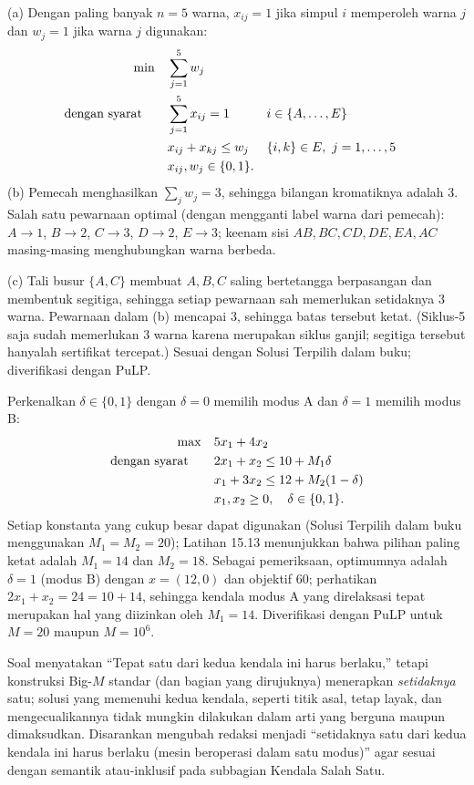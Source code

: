 
(a) Dengan paling banyak $n = 5$ warna, $x_{ij} = 1$ jika simpul $i$ memperoleh warna $j$ dan $w_j = 1$ jika warna $j$ digunakan:
\[
\begin{aligned}
\min\quad & \sum_{j=1}^{5} w_j\\
\mbox{dengan syarat}\quad\quad & \sum_{j=1}^{5} x_{ij} = 1 && i \in \{A,\dots,E\}\\
& x_{ij} + x_{kj} \leq w_j && \{i,k\} \in E,\ j = 1,\dots,5\\
& x_{ij}, w_j \in \{0,1\}.
\end{aligned}
\]
(b) Pemecah menghasilkan $\sum_j w_j = 3$, sehingga bilangan kromatiknya adalah 3. Salah satu pewarnaan optimal (dengan mengganti label warna dari pemecah): $A \to 1$, $B \to 2$, $C \to 3$, $D \to 2$, $E \to 3$; keenam sisi $AB, BC, CD, DE, EA, AC$ masing-masing menghubungkan warna berbeda.

(c) Tali busur $\{A,C\}$ membuat $A, B, C$ saling bertetangga berpasangan dan membentuk segitiga, sehingga setiap pewarnaan sah memerlukan setidaknya 3 warna. Pewarnaan dalam (b) mencapai 3, sehingga batas tersebut ketat. (Siklus-5 saja sudah memerlukan 3 warna karena merupakan siklus ganjil; segitiga tersebut hanyalah sertifikat tercepat.) Sesuai dengan Solusi Terpilih dalam buku; diverifikasi dengan PuLP.


Perkenalkan $\delta \in \{0,1\}$ dengan $\delta = 0$ memilih modus A dan $\delta = 1$ memilih modus B:
\[
\begin{aligned}
\max\quad & 5x_1 + 4x_2\\
\mbox{dengan syarat}\quad\quad & 2x_1 + x_2 \leq 10 + M_1\delta\\
& x_1 + 3x_2 \leq 12 + M_2(1-\delta)\\
& x_1, x_2 \geq 0,\quad \delta \in \{0,1\}.
\end{aligned}
\]
Setiap konstanta yang cukup besar dapat digunakan (Solusi Terpilih dalam buku menggunakan $M_1 = M_2 = 20$); Latihan 15.13 menunjukkan bahwa pilihan paling ketat adalah $M_1 = 14$ dan $M_2 = 18$. Sebagai pemeriksaan, optimumnya adalah $\delta = 1$ (modus B) dengan $x = (12, 0)$ dan objektif 60; perhatikan $2x_1 + x_2 = 24 = 10 + 14$, sehingga kendala modus A yang direlaksasi tepat merupakan hal yang diizinkan oleh $M_1 = 14$. Diverifikasi dengan PuLP untuk $M = 20$ maupun $M = 10^6$.

\begin{qaflag}
Soal menyatakan ``Tepat satu dari kedua kendala ini harus berlaku,'' tetapi konstruksi Big-$M$ standar (dan bagian yang dirujuknya) menerapkan \emph{setidaknya} satu; solusi yang memenuhi kedua kendala, seperti titik asal, tetap layak, dan mengecualikannya tidak mungkin dilakukan dalam arti yang berguna maupun dimaksudkan. Disarankan mengubah redaksi menjadi ``setidaknya satu dari kedua kendala ini harus berlaku (mesin beroperasi dalam satu modus)'' agar sesuai dengan semantik atau-inklusif pada subbagian Kendala Salah Satu.
\end{qaflag}

